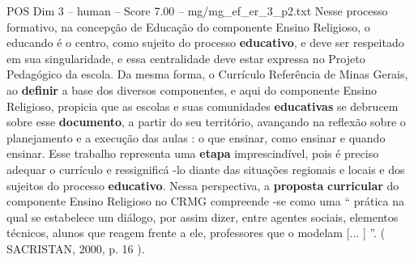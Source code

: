 \begin{textsample}{POS Dim 3 – human – Score 7.00 – mg/mg\_ef\_er\_3\_p2.txt}  \label{ex:f3_pos_005}
Nesse processo formativo, na concepção de Educação do componente Ensino Religioso, o educando é o centro, como sujeito do processo \textbf{educativo}, e deve ser respeitado em sua singularidade, e essa centralidade deve estar expressa no Projeto Pedagógico da escola.
Da mesma forma, o Currículo Referência de Minas Gerais, ao \textbf{definir} a base dos diversos componentes, e aqui do componente Ensino Religioso, propicia que as escolas e suas comunidades \textbf{educativas} se debrucem sobre esse \textbf{documento}, a partir do seu território, avançando na reflexão sobre o planejamento e a execução das aulas : o que ensinar, como ensinar e quando ensinar.
Esse trabalho representa uma \textbf{etapa} imprescindível, pois é preciso adequar o currículo e ressignificá -lo diante das situações regionais e locais e dos sujeitos do processo \textbf{educativo}.
Nessa perspectiva, a \textbf{proposta} \textbf{curricular} do componente Ensino Religioso no CRMG compreende -se como uma “ prática na qual se estabelece um diálogo, por assim dizer, entre agentes sociais, elementos técnicos, alunos que reagem frente a ele, professores que o modelam [... ] ”. ( SACRISTAN, 2000, p. 16 ).

\end{textsample}
